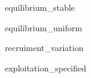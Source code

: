 
\begin{DoxyRefList}
\item[\label{test__test000001}%
\hypertarget{test__test000001}{}%
Class \hyperlink{classIOSKJ_1_1Model}{I\-O\-S\-K\-J\-:\-:Model} ]equilibrium\-\_\-stable

equilibrium\-\_\-uniform

recruiment\-\_\-variation

exploitation\-\_\-specified
\end{DoxyRefList}